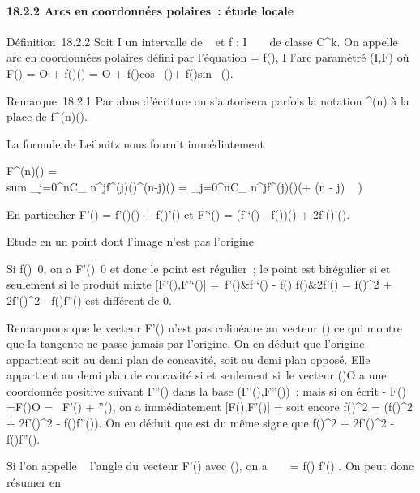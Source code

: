 \documentclass[]{article}
\begin{document}
\paragraph{18.2.2 Arcs en coordonnées polaires~: étude locale}

Définition~18.2.2 Soit I un intervalle de ~ et f : I \rightarrow~ ~ de classe
C^k. On appelle arc en coordonnées polaires défini par
l'équation \rho = f(\theta), \theta \in I l'arc paramétré (I,F) où F(\theta) = O +
f(\theta)\vecu(\theta) = O + f(\theta)cos~
(\theta)\vec\imath + f(\theta)sin~
(\theta).

Remarque~18.2.1 Par abus d'écriture on s'autorisera parfois la notation
\rho^(n) à la place de f^(n)(\theta).

La formule de Leibnitz nous fournit immédiatement

F^(n)(\theta) = \\sum
_j=0^nC_
n^jf^(j)(\theta)\vecu^(n-j)(\theta)
= \sum _j=0^nC_
n^jf^(j)(\theta)\vecu(\theta + (n - j) \pi~
 )

En particulier F'(\theta) = f'(\theta)\vecu(\theta) +
f(\theta)\vecu'(\theta) et F'`(\theta) = (f'`(\theta) -
f(\theta))\vecu(\theta) + 2f'(\theta)\vecu'(\theta).

Etude en un point dont l'image n'est pas l'origine

Si f(\theta)\neq~0, on a
F'(\theta)\neq~0 et donc le point est régulier~; le
point est birégulier si et seulement si le produit mixte
[F'(\theta),F'`(\theta)] = \left
\matrix\,f'(\theta)&f'`(\theta) - f(\theta)
\cr f(\theta)&2f'(\theta) \right  =
f(\theta)^2 + 2f'(\theta)^2 - f(\theta)f''(\theta) est différent de 0.

Remarquons que le vecteur F'(\theta) n'est pas colinéaire au vecteur
\overrightarrowOF(\theta) ce qui montre que la tangente ne
passe jamais par l'origine. On en déduit que l'origine appartient soit
au demi plan de concavité, soit au demi plan opposé. Elle appartient au
demi plan de concavité si et seulement si~le vecteur
\overrightarrowF(\theta)O a une coordonnée positive
suivant F''(\theta) dans la base (F'(\theta),F''(\theta))~; mais si on écrit - F(\theta)
=\overrightarrow F(\theta)O = \lambda~F'(\theta) + \muF''(\theta), on a
immédiatement [F(\theta),F'(\theta)] =  soit encore
f(\theta)^2 = \mu(f(\theta)^2 + 2f'(\theta)^2 -
f(\theta)f''(\theta)). On en déduit que \mu est du même signe que f(\theta)^2
+ 2f'(\theta)^2 - f(\theta)f''(\theta).

Si l'on appelle \alpha~ l'angle du vecteur F'(\theta) avec
\vecu(\theta), on a
\mathrmtg~ \alpha~ = f(\theta)
\over f'(\theta) . On peut donc résumer en
\end{document}
